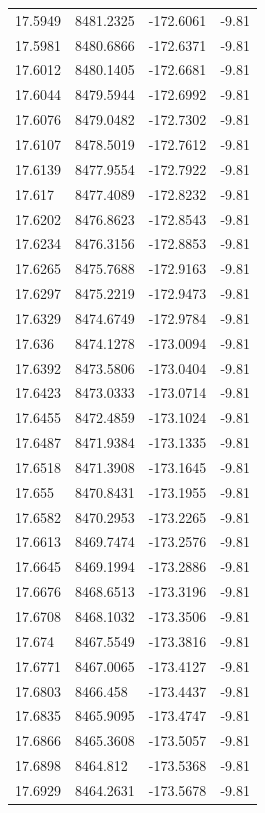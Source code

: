 \begin{table}[H]
\begin{tabular}{llll}
17.5949 & 8481.2325 & -172.6061 & -9.81 \\
17.5981 & 8480.6866 & -172.6371 & -9.81 \\
17.6012 & 8480.1405 & -172.6681 & -9.81 \\
17.6044 & 8479.5944 & -172.6992 & -9.81 \\
17.6076 & 8479.0482 & -172.7302 & -9.81 \\
17.6107 & 8478.5019 & -172.7612 & -9.81 \\
17.6139 & 8477.9554 & -172.7922 & -9.81 \\
17.617 & 8477.4089 & -172.8232 & -9.81 \\
17.6202 & 8476.8623 & -172.8543 & -9.81 \\
17.6234 & 8476.3156 & -172.8853 & -9.81 \\
17.6265 & 8475.7688 & -172.9163 & -9.81 \\
17.6297 & 8475.2219 & -172.9473 & -9.81 \\
17.6329 & 8474.6749 & -172.9784 & -9.81 \\
17.636 & 8474.1278 & -173.0094 & -9.81 \\
17.6392 & 8473.5806 & -173.0404 & -9.81 \\
17.6423 & 8473.0333 & -173.0714 & -9.81 \\
17.6455 & 8472.4859 & -173.1024 & -9.81 \\
17.6487 & 8471.9384 & -173.1335 & -9.81 \\
17.6518 & 8471.3908 & -173.1645 & -9.81 \\
17.655 & 8470.8431 & -173.1955 & -9.81 \\
17.6582 & 8470.2953 & -173.2265 & -9.81 \\
17.6613 & 8469.7474 & -173.2576 & -9.81 \\
17.6645 & 8469.1994 & -173.2886 & -9.81 \\
17.6676 & 8468.6513 & -173.3196 & -9.81 \\
17.6708 & 8468.1032 & -173.3506 & -9.81 \\
17.674 & 8467.5549 & -173.3816 & -9.81 \\
17.6771 & 8467.0065 & -173.4127 & -9.81 \\
17.6803 & 8466.458 & -173.4437 & -9.81 \\
17.6835 & 8465.9095 & -173.4747 & -9.81 \\
17.6866 & 8465.3608 & -173.5057 & -9.81 \\
17.6898 & 8464.812 & -173.5368 & -9.81 \\
17.6929 & 8464.2631 & -173.5678 & -9.81 \\

\end{tabular}
\end{table}
